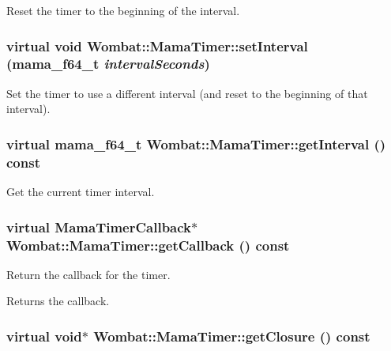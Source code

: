 Reset the timer to the beginning of the interval. \hypertarget{classWombat_1_1MamaTimer_abdc5c7645dc4d9df6c8b778cbd0afcaa}{
\subsubsection[{setInterval}]{\setlength{\rightskip}{0pt plus 5cm}virtual void Wombat::MamaTimer::setInterval (mama\_\-f64\_\-t {\em intervalSeconds})}}
\label{classWombat_1_1MamaTimer_abdc5c7645dc4d9df6c8b778cbd0afcaa}


Set the timer to use a different interval (and reset to the beginning of that interval). \hypertarget{classWombat_1_1MamaTimer_a6c6559f913fa0d154fc77d12b8322fb6}{
\subsubsection[{getInterval}]{\setlength{\rightskip}{0pt plus 5cm}virtual mama\_\-f64\_\-t Wombat::MamaTimer::getInterval () const}}
\label{classWombat_1_1MamaTimer_a6c6559f913fa0d154fc77d12b8322fb6}


Get the current timer interval. \hypertarget{classWombat_1_1MamaTimer_aa973028ea1d0525df485173c8e0de38f}{
\subsubsection[{getCallback}]{\setlength{\rightskip}{0pt plus 5cm}virtual {\bf MamaTimerCallback}$\ast$ Wombat::MamaTimer::getCallback () const}}
\label{classWombat_1_1MamaTimer_aa973028ea1d0525df485173c8e0de38f}


Return the callback for the timer. \begin{DoxyReturn}{Returns}
the callback. 
\end{DoxyReturn}
\hypertarget{classWombat_1_1MamaTimer_adf7385bd2cb4d41b8da8b3011cde1fdb}{
\subsubsection[{getClosure}]{\setlength{\rightskip}{0pt plus 5cm}virtual void$\ast$ Wombat::MamaTimer::getClosure () const}}
\label{classWombat_1_1MamaTimer_adf7385bd2cb4d41b8da8b3011cde1fdb}


